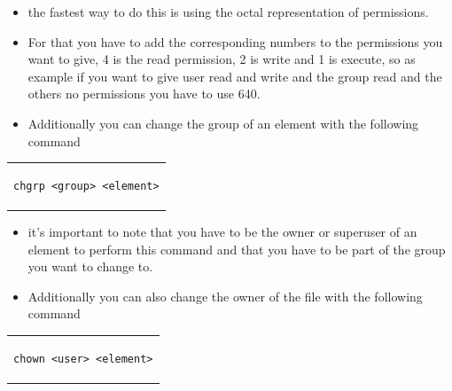 \documentclass[a4paper,10pt]{article}
\begin{document}
\begin{itemize}[leftmargin=*]
\item the fastest way to do this is using the octal representation of permissions. 
\item For that you have to add the corresponding numbers to the permissions you want to give, 4 is the read permission, 2 is write and 1 is execute, so as example if you want to give user read and write and the group read and the others no permissions you have to use 640. 
\item Additionally you can change the group of an element with the following command
\end{itemize}

\begin{center}
\begin{tabular}{c}
\begin{lstlisting}
chgrp <group> <element>
\end{lstlisting}
\end{tabular}
\end{center}


\begin{itemize}[leftmargin=*]
\item it's important to note that you have to be the owner or superuser of an element to perform this command and that you have to be part of the group you want to change to.
\item Additionally you can also change the owner of the file with the following command
\end{itemize}


\begin{center}
\begin{tabular}{c}
\begin{lstlisting}
chown <user> <element>
\end{lstlisting}
\end{tabular}
\end{center}
\end{document}
